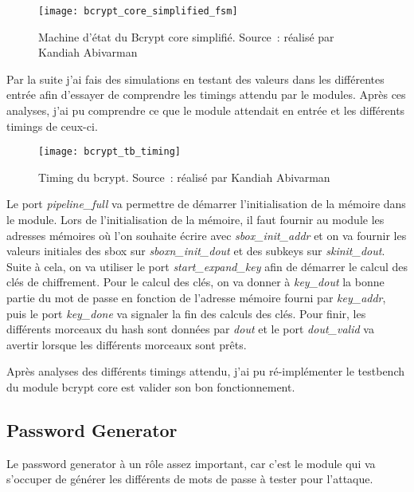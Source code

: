 \newpage

\begin{figure}[tbph!]
	\centering
	\texttt{[image: bcrypt\_core\_simplified\_fsm]}
	\caption[Machine d'état Bcrypt core simplifié]{Machine d'état du Bcrypt core simplifié. Source : réalisé par Kandiah Abivarman}
	\label{fig:bcrypt_core_simplified_fsm}
\end{figure}

Par la suite j'ai fais des simulations en testant des valeurs dans les différentes entrée afin d'essayer de comprendre les timings attendu par le modules. Après ces analyses, j'ai pu comprendre ce que le module attendait en entrée et les différents timings de ceux-ci.

\newpage

\begin{figure}[tbph!]
	\centering
	\texttt{[image: bcrypt\_tb\_timing]}
	\caption[Timing du bcrypt]{Timing du bcrypt. Source : réalisé par Kandiah Abivarman}
	\label{fig:bcrypt_tb_timing}
\end{figure}

Le port \textit{pipeline\_full} va permettre de démarrer l'initialisation de la mémoire dans le module. Lors de l'initialisation de la mémoire, il faut fournir au module les adresses mémoires où l'on souhaite écrire avec \textit{sbox\_init\_addr} et on va fournir les valeurs initiales des \gls{sbox} sur \textit{sboxn\_init\_dout} et des subkeys sur \textit{skinit\_dout}. Suite à cela, on va utiliser le port \textit{start\_expand\_key} afin de démarrer le calcul des clés de chiffrement. Pour le calcul des clés, on va donner à \textit{key\_dout} la bonne partie du mot de passe en fonction de l'adresse mémoire fourni par \textit{key\_addr}, puis le port \textit{key\_done} va signaler la fin des calculs des clés. Pour finir, les différents morceaux du hash sont données par \textit{dout} et le port \textit{dout\_valid} va avertir lorsque les différents morceaux sont prêts.

Après analyses des différents timings attendu, j'ai pu ré-implémenter le testbench du module bcrypt core est valider son bon fonctionnement.

\newpage

\subsection{Password Generator}

Le password generator à un rôle assez important, car c'est le module qui va s'occuper de générer les différents de mots de passe à tester pour l'attaque.

